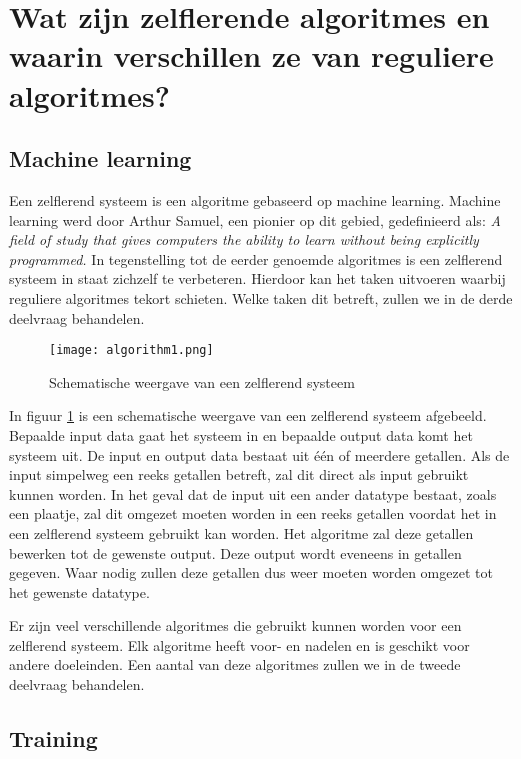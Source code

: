 \section{Wat zijn zelflerende algoritmes en waarin verschillen ze van reguliere algoritmes?}

\subsection{Machine learning}
Een zelflerend systeem is een algoritme gebaseerd op machine learning. Machine learning werd door Arthur Samuel, een pionier op dit gebied, gedefinieerd als: 
\textit{A field of study that gives computers the ability to learn without being explicitly programmed.} \cite{ArthurSamuel} 
In tegenstelling tot de eerder genoemde algoritmes is een zelflerend systeem in staat zichzelf te verbeteren. Hierdoor kan het taken uitvoeren waarbij reguliere algoritmes tekort schieten. Welke taken dit betreft, zullen we in de derde deelvraag behandelen. 

\begin{figure}[h]
  \centering
    \texttt{[image: algorithm1.png]}
  \caption{Schematische weergave van een zelflerend systeem}
  \label{fig:algorithm1}
\end{figure}

In figuur \ref{fig:algorithm1}  is een schematische weergave van een zelflerend systeem afgebeeld. Bepaalde input data gaat het systeem in en bepaalde output data komt het systeem uit. De input en output data bestaat uit \'e\'en of meerdere getallen. Als de input simpelweg een reeks getallen betreft, zal dit direct als input gebruikt kunnen worden. In het geval dat de input uit een ander datatype bestaat, zoals een plaatje, zal dit omgezet moeten worden in een reeks getallen voordat het in een zelflerend systeem gebruikt kan worden. Het algoritme zal deze getallen bewerken tot de gewenste output. Deze output wordt eveneens in getallen gegeven. Waar nodig zullen deze getallen dus weer moeten worden omgezet tot het gewenste datatype.

Er zijn veel verschillende algoritmes die gebruikt kunnen worden voor een zelflerend systeem. Elk algoritme heeft voor- en nadelen en is geschikt voor andere doeleinden. Een aantal van deze algoritmes zullen we in de tweede deelvraag behandelen. 

\subsection{Training}

